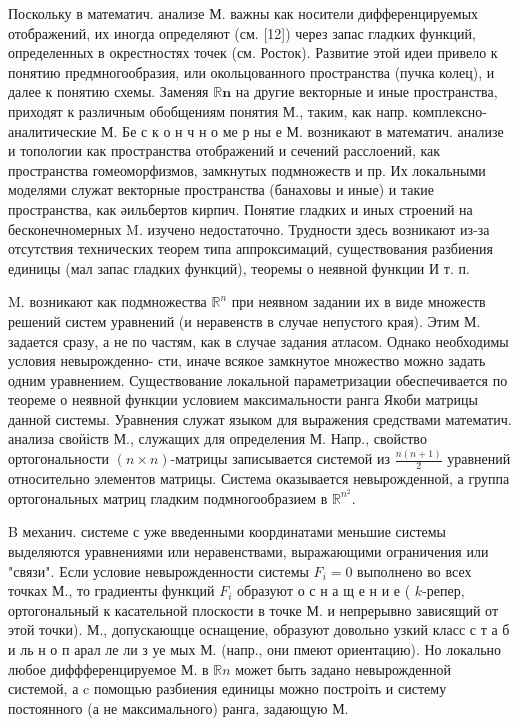 \documentclass[10pt]{article}
\begin{document}
Поскольку в математич. анализе М. важны как носители дифференцируемых отображений, их иногда определяют (см. [12]) через запас гладких функций, определенных в окрестностях точек (см. Росток). Развитие этой идеи привело к понятию предмногообразия, или окольцованного пространства (пучка колец), и далее к понятию схемы. Заменяя $\mathbb{R} \boldsymbol{n}$ на другие векторные и иные пространства, приходят к различным обобщениям понятия М., таким, как напр. комплексно-аналитические М. Бе с к о н ч н о ме р ны е М. возникают в математич. анализе и топологии как пространства отображений и сечений расслоений, как пространства гомеоморфизмов, замкнутых подмножеств и пр. Их локальными моделями служат векторные пространства (банаховы и иные) и такие пространства, как әильбертов кирпич. Понятие гладких и иных строений на бесконечномерных M. изучено недостаточно. Трудности здесь возникают из-за отсутствия технических теорем типа аппроксимаций, существования разбиения единицы (мал запас гладких функций), теоремы о неявной функции И т. п.



M. возникают как подмножества $\mathbb{R}^{n}$ при неявном задании их в виде множеств решений систем уравнений (и неравенств в случае непустого края). Этим М. задается сразу, а не по частям, как в случае задания атласом. Однако необходимы условия невырожденно- сти, иначе всякое замкнутое множество можно задать одним уравнением. Существование локальной параметризации обеспечивается по теореме о неявной функции условием максимальности ранга Якоби матрицы данной системы. Уравнения служат языком для выражения средствами математич. анализа своӥіств М., служащих для определения М. Напр., свойство ортогональности $(n \times n)$-матрицы записывается системой из $\frac{n(n+1)}{2}$ уравнений относительно элементов матрицы. Система оказывается невырожденной, а группа ортогональных матриц гладким подмногообразием в $\mathbb{R}^{n^{2}}$.



B механич. системе с уже введенными координатами меньшие системы выделяются уравнениями или неравенствами, выражающими ограничения или "связи". Если условие невырожденности системы $F_{i}=0$ выполнено во всех точках М., то градиенты функций $F_{i}$ образуют о с н а щ е н и е ( $k$-репер, ортогональный к касательной плоскости в точке М. и непрерывно зависящий от этой точки). М., допускающце оснащение, образуют довольно узкий класс с т а б и ль н о п арал ле ли з уе мых М. (напр., они пмеют ориентацию). Но локально любое диффференцируемое М. в $\mathbb{R} n$ может быть задано невырожденной системой, а c помощью разбиения единицы можно построіть и систему постоянного (а не максимального) ранга, задающую М.
\end{document}

